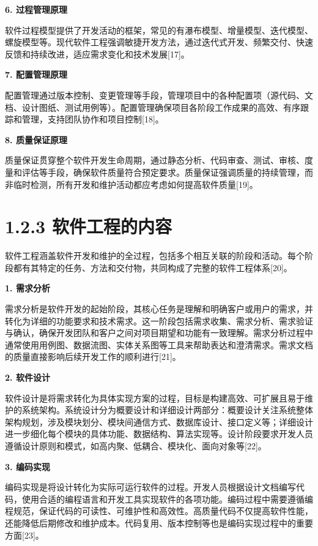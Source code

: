 \documentclass[12pt,a4paper]{ctexbook}
\begin{document}
\textbf{6. 过程管理原理}

软件过程模型提供了开发活动的框架，常见的有瀑布模型、增量模型、迭代模型、螺旋模型等。现代软件工程强调敏捷开发方法，通过迭代式开发、频繁交付、快速反馈和持续改进，适应需求变化和技术发展{[}17{]}。

\textbf{7. 配置管理原理}

配置管理通过版本控制、变更管理等手段，管理项目中的各种配置项（源代码、文档、设计图纸、测试用例等）。配置管理确保项目各阶段工作成果的高效、有序跟踪和管理，支持团队协作和项目控制{[}18{]}。

\textbf{8. 质量保证原理}

质量保证贯穿整个软件开发生命周期，通过静态分析、代码审查、测试、审核、度量和评估等手段，确保软件质量符合预定要求。质量保证强调质量的持续管理，而非临时检测，所有开发和维护活动都应考虑如何提高软件质量{[}19{]}。


\section{1.2.3
软件工程的内容}\label{ux8f6fux4ef6ux5de5ux7a0bux7684ux5185ux5bb9}

软件工程涵盖软件开发和维护的全过程，包括多个相互关联的阶段和活动。每个阶段都有其特定的任务、方法和交付物，共同构成了完整的软件工程体系{[}20{]}。

\textbf{1. 需求分析}

需求分析是软件开发的起始阶段，其核心任务是理解和明确客户或用户的需求，并转化为详细的功能要求和技术需求。这一阶段包括需求收集、需求分析、需求验证与确认，确保开发团队和客户之间对项目期望和功能有一致理解。需求分析过程中通常使用用例图、数据流图、实体关系图等工具来帮助表达和澄清需求。需求文档的质量直接影响后续开发工作的顺利进行{[}21{]}。

\textbf{2. 软件设计}

软件设计是将需求转化为具体实现方案的过程，目标是构建高效、可扩展且易于维护的系统架构。系统设计分为概要设计和详细设计两部分：概要设计关注系统整体架构规划，涉及模块划分、模块间通信方式、数据库设计、接口定义等；详细设计进一步细化每个模块的具体功能、数据结构、算法实现等。设计阶段要求开发人员遵循设计原则和模式，如高内聚、低耦合、模块化、面向对象等{[}22{]}。

\textbf{3. 编码实现}

编码实现是将设计转化为实际可运行软件的过程。开发人员根据设计文档编写代码，使用合适的编程语言和开发工具实现软件的各项功能。编码过程中需要遵循编程规范，保证代码的可读性、可维护性和高效性。高质量代码不仅提高软件性能，还能降低后期修改和维护成本。代码复用、版本控制等也是编码实现过程中的重要方面{[}23{]}。
\end{document}

